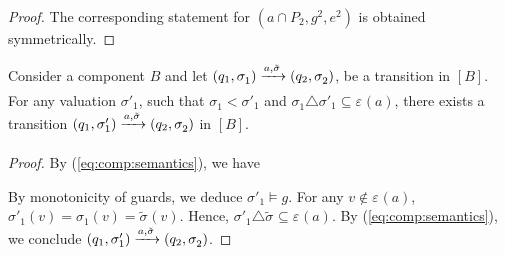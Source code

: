 \documentclass{llncs}
\newcommand{\eq}[1]{(\ref{eq:#1})}
\newcommand{\goesto}[2][]{\ensuremath{\xrightarrow[{#1}\relax]{#2}}}
\newcommand{\order}{<}
\newcommand{\val}[3][]{\ensuremath{#1{\sigma}^{#2}_{#3}}}
\newcommand{\primeit}[1]{#1'}
\newcommand{\export}[1][]{\ensuremath{\varepsilon_{#1}}}
\newcommand{\valdiff}[2]{\ensuremath{#1 \triangle #2}}
\newcommand{\semopen}[1]{\ensuremath{[{#1}]}}
\begin{document}
\begin{proof}
  The corresponding statement for $(a \cap P_2, g^2, e^2)$ is obtained
  symmetrically.
\end{proof}

\begin{lemma}
  \label{lem:stepabove}
  Consider a component $B$ and let 
%
  $
  (q_1, \val{}{1})
%
  \goesto{a, \val[\tilde]{}{}}
%
  (q_2, \val{}{2})
  $,
%
  be a transition in $\semopen{B}$.  For any valuation
  $\val[\primeit]{}{1}$, such that
  $\val{}{1} \order \val[\primeit]{}{1}$ and
  $\valdiff{\val{}{1}}{\val[\primeit]{}{1}} \subseteq \export(a)$,
  there exists a transition
%
  $
  (q_1, \val[\primeit]{}{1})
%
  \goesto{a, \val[\tilde]{}{}}
%
  (q_2, \val{}{2})
  $
%
  in $\semopen{B}$.
\end{lemma}
%
\begin{proof}
  By \eq{comp:semantics}, we have
%

  By monotonicity of guards, we deduce
  $\val[\primeit]{}{1} \models g$.
  For any $v \not\in \export(a)$,
  $\val[\primeit]{}{1}(v) = \val{}{1}(v) = \val[\tilde]{}{}(v)$.
  Hence, 
  $\valdiff{\val[\primeit]{}{1}}{\val[\tilde]{}{}}
  \subseteq \export(a)$.
  By \eq{comp:semantics}, we conclude 
%
  $
  (q_1, \val[\primeit]{}{1})
%
  \goesto{a, \val[\tilde]{}{}}
%
  (q_2, \val{}{2})
  $.  
\end{proof}
\end{document}
